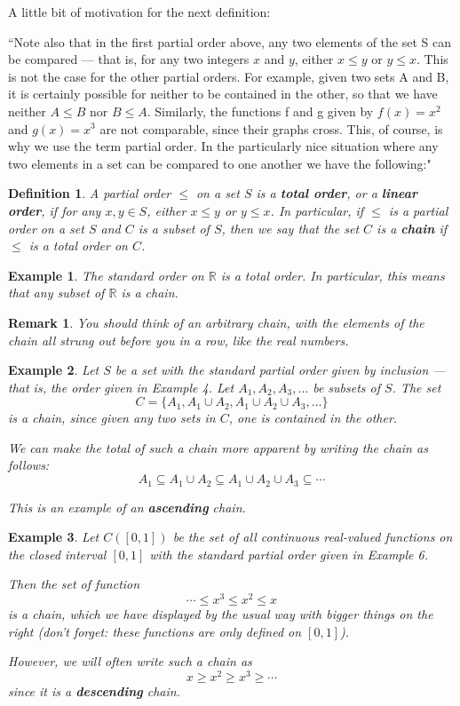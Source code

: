 \documentclass[12pt,reqno]{amsart}
\theoremstyle{plain}
\newtheorem{defi}{Definition}
\newtheorem{rem}{Remark}
\newtheorem{ex}{Example}
\newcommand{\rr}{\mathbb R}
\begin{document}
A little bit of motivation for the next definition: \begin{center} ``Note also that in the first partial order above, any two elements of the set S can be compared — that is, for any two integers $x$ and $y$, either $x \leq y$ or $y \leq x$. This is not the case for the other partial orders. For example, given two sets A and B, it is certainly possible for neither to be contained in the other, so that we have neither $A \leq B$ nor $B \leq A$. Similarly, the functions f and g given by $f(x) = x^2$ and $g(x) = x^3$ are not comparable, since their graphs cross. This, of course, is why we use the term partial order. In the particularly nice situation where any two elements in a set can be compared to one another we have the following:"
\end{center} 
\begin{defi} A partial order $\leq$ on a set $S$ is a \textbf{total order}, or a \textbf{linear order}, if for any $x, y \in S$, either $x \leq y$ or $y \leq x$. In particular, if $\leq$ is a partial order on a set $S$ and $C$ is a subset of $S$, then we say that the set $C$ is a \textbf{chain} if $\leq$ is a total order on $C$. 
\end{defi} 
\begin{ex} The standard order on $\rr$ is a total order. In particular, this means that any subset of $\rr$ is a chain.
\end{ex} 
\begin{rem} You should think of an arbitrary chain, with the elements of the chain all strung out before you in a row, like the real numbers. 
\end{rem}
\begin{ex} Let $S$ be a set with the standard partial order given by inclusion — that is, the order given in Example 4. Let $A_1, A_2, A_3, \ldots$ be subsets of $S$. The set \[ C = \{ A_1, A_1 \cup A_2, A_1 \cup A_2 \cup A_3, \ldots \} \] is a chain, since given any two sets in $C$, one is contained in the other. 

We can make the total of such a chain more apparent by writing the chain as follows: \[ A_1 \subseteq A_1 \cup A_2 \subseteq A_1 \cup A_2 \cup A_3 \subseteq \cdots \]

This is an example of an \textbf{ascending} chain. 
\end{ex} 
\begin{ex} Let $C([0, 1])$ be the set of all continuous real-valued functions on the closed interval $[0, 1]$ with the standard partial order given in Example 6.

Then the set of function \[ \cdots \leq x^3 \leq x^2 \leq x \] is a chain, which we have displayed by the usual way with bigger things on the right (don't forget: these functions are only defined on $[0, 1]$). 

However, we will often write such a chain as \[ x \geq x^2 \geq x^3 \geq \cdots \] since it is a \textbf{descending} chain. 
\end{ex} 
\end{document}
